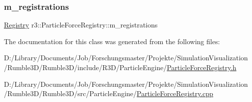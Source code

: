 \subsubsection{\texorpdfstring{m\+\_\+registrations}{m\_registrations}}
{\footnotesize\ttfamily \mbox{\hyperlink{classr3_1_1_particle_force_registry_a5529157176d2c10b2afde82e6871c7eb}{Registry}} r3\+::\+Particle\+Force\+Registry\+::m\+\_\+registrations\hspace{0.3cm}{\ttfamily [protected]}}



The documentation for this class was generated from the following files\+:\begin{DoxyCompactItemize}
\item 
D\+:/\+Library/\+Documents/\+Job/\+Forschungsmaster/\+Projekte/\+Simulation\+Visualization/\+Rumble3\+D/\+Rumble3\+D/include/\+R3\+D/\+Particle\+Engine/\mbox{\hyperlink{_particle_force_registry_8h}{Particle\+Force\+Registry.\+h}}\item 
D\+:/\+Library/\+Documents/\+Job/\+Forschungsmaster/\+Projekte/\+Simulation\+Visualization/\+Rumble3\+D/\+Rumble3\+D/src/\+Particle\+Engine/\mbox{\hyperlink{_particle_force_registry_8cpp}{Particle\+Force\+Registry.\+cpp}}\end{DoxyCompactItemize}
